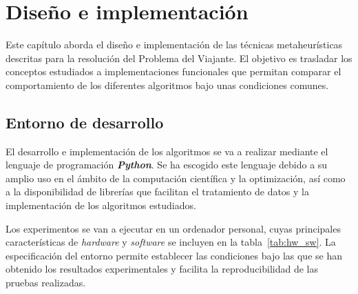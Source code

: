 %
%
%
% 
%
%
%
%

\chapter{Diseño e implementación}
\label{cha:design}

Este capítulo aborda el diseño e implementación de las técnicas metaheurísticas descritas para la resolución del Problema
del Viajante. El objetivo es trasladar los conceptos estudiados a implementaciones funcionales que permitan comparar el 
comportamiento de los diferentes algoritmos bajo unas condiciones comunes.

\section{Entorno de desarrollo}
\label{sec:dev_env}

El desarrollo e implementación de los algoritmos se va a realizar mediante el lenguaje de programación \textbf{\textit{Python}}.
Se ha escogido este lenguaje debido a su amplio uso en el ámbito de la computación científica y la optimización, así como a la 
disponibilidad de librerías que facilitan el tratamiento de datos y la implementación de los algoritmos estudiados.

Los experimentos se van a ejecutar en un ordenador personal, cuyas principales características de \textit{hardware} y
\textit{software} se incluyen en la tabla~\ref{tab:hw_sw}. La especificación del entorno permite establecer las condiciones
bajo las que se han obtenido los resultados experimentales y facilita la reproducibilidad de las pruebas realizadas.

